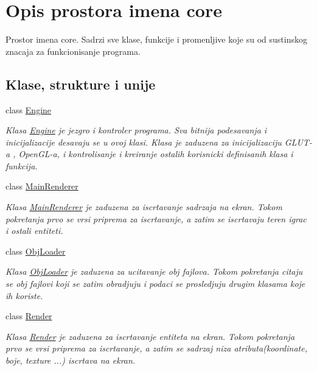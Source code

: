\hypertarget{namespacecore}{}\section{Opis prostora imena core}
\label{namespacecore}


Prostor imena core. Sadrzi sve klase, funkcije i promenljive koje su od sustinskog znacaja za funkcionisanje programa.  


\subsection*{Klase, strukture i unije}
\begin{DoxyCompactItemize}
\item 
class \hyperlink{classcore_1_1Engine}{Engine}
\begin{DoxyCompactList}\small\item\em Klasa \hyperlink{classcore_1_1Engine}{Engine} je jezgro i kontroler programa. Sva bitnija podesavanja i inicijalizacije desavaju se u ovoj klasi. Klasa je zaduzena za inicijalizaciju G\+L\+U\+T-\/a , Open\+G\+L-\/a, i kontrolisanje i kreiranje ostalih korisnicki definisanih klasa i funkcija. \end{DoxyCompactList}\item 
class \hyperlink{classcore_1_1MainRenderer}{Main\+Renderer}
\begin{DoxyCompactList}\small\item\em Klasa \hyperlink{classcore_1_1MainRenderer}{Main\+Renderer} je zaduzena za iscrtavanje sadrzaja na ekran. Tokom pokretanja prvo se vrsi priprema za iscrtavanje, a zatim se iscrtavaju teren igrac i ostali entiteti. \end{DoxyCompactList}\item 
class \hyperlink{classcore_1_1ObjLoader}{Obj\+Loader}
\begin{DoxyCompactList}\small\item\em Klasa \hyperlink{classcore_1_1ObjLoader}{Obj\+Loader} je zaduzena za ucitavanje obj fajlova. Tokom pokretanja citaju se obj fajlovi koji se zatim obradjuju i podaci se prosledjuju drugim klasama koje ih koriste. \end{DoxyCompactList}\item 
class \hyperlink{classcore_1_1Render}{Render}
\begin{DoxyCompactList}\small\item\em Klasa \hyperlink{classcore_1_1Render}{Render} je zaduzena za iscrtavanje entiteta na ekran. Tokom pokretanja prvo se vrsi priprema za iscrtavanje, a zatim se sadrzaj niza atributa(koordinate, boje, texture ...) iscrtava na ekran. \end{DoxyCompactList}\item 

\end{DoxyCompactItemize}

